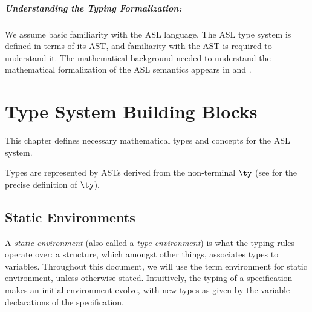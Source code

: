 \documentclass{book}
\begin{document}
\paragraph{Understanding the Typing Formalization:}
We assume basic familiarity with the ASL language.
The ASL type system is defined in terms of its AST,
and familiarity with the AST is \underline{required} to understand it.
The mathematical background needed to understand the mathematical formalization
of the ASL semantics appears in  and .



\chapter{Type System Building Blocks}
\label{chap:typesystembuildingblocks}
This chapter defines necessary mathematical types and concepts for the ASL system.

Types are represented by ASTs derived from the non-terminal $\ty$ (see \cite{ASLAbstractSyntaxReference}
for the precise definition of $\ty$).

\section{Static Environments}

A \emph{static environment} (also called a \emph{type environment}) is what the typing rules operate over:
a structure, which amongst other things, associates types to variables.
Throughout this document, we will use the term environment for static environment, unless otherwise stated.
Intuitively, the typing of a
specification makes an initial environment evolve, with new types as given by the
variable declarations of the specification.
\end{document}
